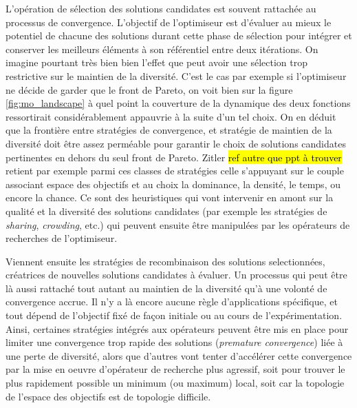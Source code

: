 L'opération de sélection des solutions candidates est souvent rattachée au processus de convergence. L'objectif de l'optimiseur est d'évaluer au mieux le potentiel de chacune des solutions durant cette phase de sélection pour intégrer et conserver les meilleurs éléments à son référentiel entre deux itérations. On imagine pourtant très bien bien l'effet que peut avoir une sélection trop restrictive sur le maintien de la diversité. C'est le cas par exemple si l'optimiseur ne décide de garder que le front de Pareto, on voit bien sur la figure \ref{fig:mo_landscape} à quel point la couverture de la dynamique des deux fonctions ressortirait considérablement appauvrie à la suite d'un tel choix. On en déduit que la frontière entre stratégies de convergence, et stratégie de maintien de la diversité doit être assez perméable pour garantir le choix de solutions candidates pertinentes en dehors du seul front de Pareto. Zitler \hl{ref autre que ppt à trouver} retient par exemple parmi ces classes de stratégies celle s'appuyant sur le couple associant espace des objectifs et au choix la dominance, la densité, le temps, ou encore la chance. Ce sont des heuristiques qui vont intervenir en amont sur la qualité et la diversité des solutions candidates (par exemple les stratégies de \textit{sharing}, \textit{crowding}, etc.) qui peuvent ensuite être manipulées par les opérateurs de recherches de l'optimiseur.

Viennent ensuite les stratégies de recombinaison des solutions selectionnées, créatrices de nouvelles solutions candidates à évaluer. Un processus qui peut être là aussi rattaché tout autant au maintien de la diversité qu'à une volonté de convergence accrue. Il n'y a là encore aucune règle d'applications spécifique, et tout dépend de l'objectif fixé de façon initiale ou au cours de l'expérimentation. Ainsi, certaines stratégies intégrés aux opérateurs peuvent être mis en place pour limiter une convergence trop rapide des solutions (\textit{premature convergence}) liée à une perte de diversité, alors que d'autres vont tenter d'accélérer cette convergence par la mise en oeuvre d'opérateur de recherche plus agressif, soit pour trouver le plus rapidement possible un minimum (ou maximum) local, soit car la topologie de l'espace des objectifs est de topologie difficile.

